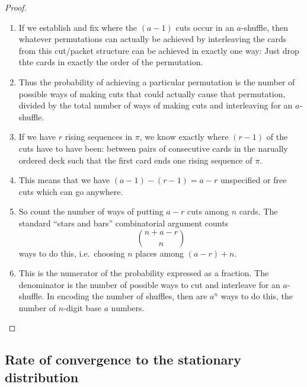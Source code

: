 \documentclass[12pt]{article}
\begin{document}
\begin{proof}
    \begin{enumerate}
        \item
            If we establish and fix where the \( (a-1) \) cuts occur in
            an \( a \)-shuffle, then whatever permutations can actually
            be achieved by interleaving the cards from this cut/packet
            structure can be achieved in exactly one way:  Just drop
            thte cards in exactly the order of the permutation.
        \item
            Thus the probability of achieving a particular permutation
            is the number of possible ways of making cuts that could
            actually cause that permutation, divided by the total number
            of ways of making cuts and interleaving for an \( a \)-shuffle.
        \item
            If we have \( r \) rising sequences in \( \pi \), we know
            exactly where \( (r-1) \) of the cuts have to have been:
            between pairs of consecutive cards in the narually ordered
            deck such that the first card ends one rising sequence of \(
            \pi \).
        \item
            This means that we have \( (a-1) - (r-1) = a-r \)
            unspecified or free cuts which can go anywhere.
        \item
            So count the number of ways of putting \( a-r \) cuts among \(
            n \) cards.  The standard ``stars and bars'' combinatorial
            argument counts
            \[
                \binom{n + a-r}{n}
            \] ways to do this, i.e.\ choosing \( n \) places among \( (a-r)
            + n \).
        \item
            This is the numerator of the probability expressed as a
            fraction.  The denominator is the number of possible ways to
            cut and interleave for an \( a \)-shuffle.  In encoding the
            number of shuffles, then are \( a^n \) ways to do this, the
            number of \( n \)-digit base \( a \) numbers.
    \end{enumerate}
\end{proof}

\subsection*{Rate of convergence to the stationary distribution}
\end{document}

